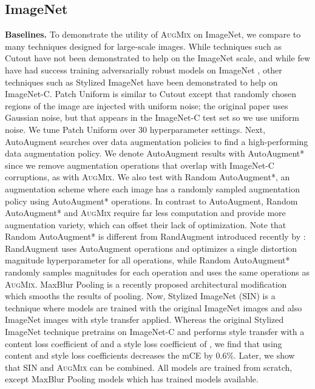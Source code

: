 \documentclass{article} \usepackage{iclr2020_conference,times}
\begin{document}
\subsection{ImageNet}
\noindent\textbf{Baselines.} To demonstrate the utility of \textsc{AugMix} on ImageNet, we compare to many techniques designed for large-scale images. While techniques such as Cutout \citep{Devries2017ImprovedRO} have not been demonstrated to help on the ImageNet scale, and while few have had success training adversarially robust models on ImageNet \citep{alpbroken}, other techniques such as Stylized ImageNet have been demonstrated to help on ImageNet-C. Patch Uniform \citep{Lopes2019ImprovingRW} is similar to Cutout except that randomly chosen regions of the image are injected with uniform noise; the original paper uses Gaussian noise, but that appears in the ImageNet-C test set so we use uniform noise. We tune Patch Uniform over 30 hyperparameter settings.
Next, AutoAugment \citep{Cubuk2018AutoAugmentLA} searches over data augmentation policies to find a high-performing data augmentation policy. We denote AutoAugment results with AutoAugment* since we remove augmentation operations that overlap with ImageNet-C corruptions, as with \textsc{AugMix}. We also test with Random AutoAugment*, an augmentation scheme where each image has a randomly sampled augmentation policy using AutoAugment* operations. In contrast to AutoAugment, Random AutoAugment* and \textsc{AugMix} require far less computation and provide more augmentation variety, which can offset their lack of optimization. 
Note that Random AutoAugment* is different from RandAugment introduced recently by \citet{cubuk2019randaugment}: RandAugment uses AutoAugment operations and optimizes a single distortion magnitude hyperparameter for all operations, while Random AutoAugment* randomly samples magnitudes for each operation and uses the same operations as \textsc{AugMix}.
MaxBlur Pooling \citep{zhang2019shiftinvar} is a recently proposed architectural modification which smooths the results of pooling. Now, Stylized ImageNet (SIN) is a technique where models are trained with the original ImageNet images and also ImageNet images with style transfer applied. Whereas the original Stylized ImageNet technique pretrains on ImageNet-C and performs style transfer with a content loss coefficient of  and a style loss coefficient of , we find that using  content and style loss coefficients decreases the mCE by 0.6\%. Later, we show that SIN and \textsc{AugMix} can be combined. All models are trained from scratch, except MaxBlur Pooling models which has trained models available.
\end{document}
